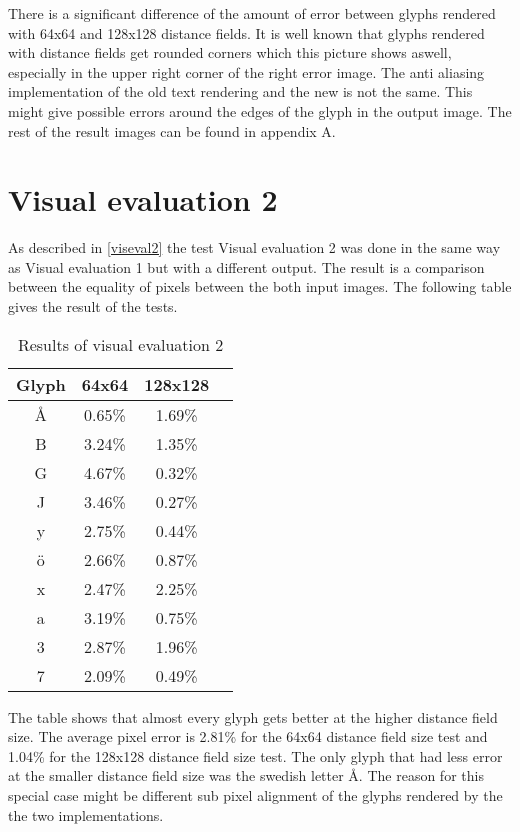 There is a significant difference of the amount of error between glyphs rendered with 64x64 and 128x128 distance fields. It is well known that glyphs rendered with distance fields get rounded corners which this picture shows aswell, especially in the upper right corner of the right error image. The anti aliasing implementation of the old text rendering and the new is not the same. This might give possible errors around the edges of the glyph in the output image. The rest of the result images can be found in appendix A. 

\section{Visual evaluation 2}
As described in \ref{viseval2} the test Visual evaluation 2 was done in the same way as Visual evaluation 1 but with a different output. The result is a comparison between the equality of pixels between the both input images. The following table gives the result of the tests. 
\begin{table}[H]
\caption{Results of visual evaluation 2}
\centering
\begin{tabular}{c c c c}
\hline
\hline %
Glyph & 64x64 & 128x128\\ [0.5ex] %
\hline
Å & 0.65\% & 1.69\% \\
B & 3.24\% & 1.35\% \\
G & 4.67\% & 0.32\% \\
J & 3.46\% & 0.27\% \\
y & 2.75\% & 0.44\% \\ 
ö & 2.66\% & 0.87\% \\
x & 2.47\% & 2.25\% \\
a & 3.19\% & 0.75\% \\
3 & 2.87\% & 1.96\% \\
7 & 2.09\% & 0.49\% \\ [1ex]
\hline
\end{tabular}
\label{table:nonlin}
\end{table}

The table shows that almost every glyph gets better at the higher distance field size. The average pixel error is 2.81\% for the 64x64 distance field size test and 1.04\% for the 128x128 distance field size test. The only glyph that had less error at the smaller distance field size was the swedish letter Å. The reason for this special case might be different sub pixel alignment of the glyphs rendered by the the two implementations.
